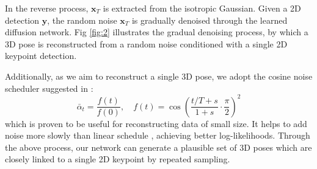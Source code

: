 \documentclass[letterpaper, 10 pt, conference]{ieeeconf}
\begin{document}
In the reverse process, $\mathbf{x}_T$ is extracted from the isotropic Gaussian.
Given a 2D detection $\mathbf{y}$, the random noise $\mathbf{x}_T$ is gradually denoised through the learned diffusion network.
Fig \ref{fig:2} illustrates the gradual denoising process, by which a 3D pose is reconstructed from a random noise conditioned with a single 2D keypoint detection.

Additionally, as we aim to reconstruct a single 3D pose, we adopt the cosine noise scheduler suggested in \cite{dhariwal2021diffusion}:
\begin{equation}
    \bar{\alpha}_t = \frac{f(t)}{f(0)}, \quad f(t) = \cos(\frac{t/T+s}{1+s}\cdot\frac{\pi}{2})^2
\end{equation}
which is proven to be useful for reconstructing data of small size.
It helps to add noise more slowly than linear schedule \cite{ho2020denoising}, achieving better log-likelihoods.
Through the above process, our network can generate a plausible set of 3D poses which are closely linked to a single 2D keypoint by repeated sampling.
\end{document}
